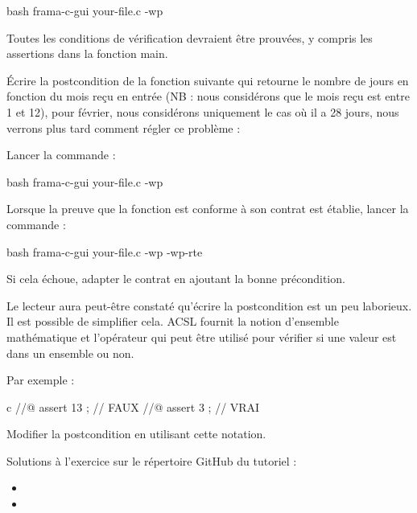 \begin{CodeBlock}{bash}
frama-c-gui your-file.c -wp
\end{CodeBlock}


Toutes les conditions de vérification devraient être prouvées, y compris les
assertions dans la fonction main.






Écrire la postcondition de la fonction suivante qui retourne le nombre de
jours en fonction du mois reçu en entrée (NB : nous considérons que le mois
reçu est entre 1 et 12), pour février, nous considérons uniquement le cas
où il a 28 jours, nous verrons plus tard comment régler ce problème :




Lancer la commande :


\begin{CodeBlock}{bash}
frama-c-gui your-file.c -wp
\end{CodeBlock}


Lorsque la preuve que la fonction est conforme à son contrat est établie, lancer
la commande :

\begin{CodeBlock}{bash}
frama-c-gui your-file.c -wp -wp-rte
\end{CodeBlock}


Si cela échoue, adapter le contrat en ajoutant la bonne précondition.


Le lecteur aura peut-être constaté qu'écrire la postcondition est un peu
laborieux. Il est possible de simplifier cela. ACSL fournit la notion
d'ensemble mathématique et l'opérateur  qui
peut être utilisé pour vérifier si une valeur est dans un ensemble ou non.


Par exemple :

\begin{CodeBlock}{c}
//@ assert 13  ; // FAUX
//@ assert 3   ; // VRAI
\end{CodeBlock}


Modifier la postcondition en utilisant cette notation.


\begin{Information}
  Solutions à l'exercice sur le répertoire GitHub du tutoriel :
  \begin{itemize}
    \item {}
    \item {}
  \end{itemize}
\end{Information}


